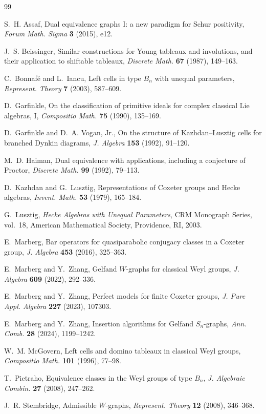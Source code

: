 \documentclass[11pt]{article}
\theoremstyle{definition}
\theoremstyle{remark}
\begin{document}
\begin{thebibliography}{99}

S.~H. Assaf,
\newblock Dual equivalence graphs I: a new paradigm for Schur positivity,
\newblock \emph{Forum Math. Sigma} \textbf{3} (2015), e12.

J.~S. Beissinger,
\newblock Similar constructions for Young tableaux and involutions, and
their application to shiftable tableaux,
\newblock \emph{Discrete Math.} \textbf{67} (1987), 149--163.

C.~Bonnaf\'e and L.~Iancu,
\newblock Left cells in type $B_n$ with unequal parameters,
\newblock \emph{Represent. Theory} \textbf{7} (2003), 587--609.

D.~Garfinkle,
\newblock On the classification of primitive ideals for complex
classical Lie algebras, I,
\newblock \emph{Compositio Math.} \textbf{75} (1990), 135--169.

D.~Garfinkle and D.~A. Vogan, Jr.,
\newblock On the structure of Kazhdan--Lusztig cells for branched Dynkin
diagrams,
\newblock \emph{J. Algebra} \textbf{153} (1992), 91--120.

M.~D. Haiman,
\newblock Dual equivalence with applications, including a conjecture of
Proctor,
\newblock \emph{Discrete Math.} \textbf{99} (1992), 79--113.

D.~Kazhdan and G.~Lusztig,
\newblock Representations of Coxeter groups and Hecke algebras,
\newblock \emph{Invent. Math.} \textbf{53} (1979), 165--184.

G.~Lusztig,
\newblock \emph{Hecke Algebras with Unequal Parameters},
\newblock CRM Monograph Series, vol.~18, American Mathematical Society,
Providence, RI, 2003.

E.~Marberg,
\newblock Bar operators for quasiparabolic conjugacy classes in a Coxeter
group,
\newblock \emph{J. Algebra} \textbf{453} (2016), 325--363.

E.~Marberg and Y.~Zhang,
\newblock Gelfand $W$-graphs for classical Weyl groups,
\newblock \emph{J. Algebra} \textbf{609} (2022), 292--336.

E.~Marberg and Y.~Zhang,
\newblock Perfect models for finite Coxeter groups,
\newblock \emph{J. Pure Appl. Algebra} \textbf{227} (2023), 107303.

E.~Marberg and Y.~Zhang,
\newblock Insertion algorithms for Gelfand $S_n$-graphs,
\newblock \emph{Ann. Comb.} \textbf{28} (2024), 1199--1242.

W.~M. McGovern,
\newblock Left cells and domino tableaux in classical Weyl groups,
\newblock \emph{Compositio Math.} \textbf{101} (1996), 77--98.

T.~Pietraho,
\newblock Equivalence classes in the Weyl groups of type $B_n$,
\newblock \emph{J. Algebraic Combin.} \textbf{27} (2008), 247--262.

J.~R. Stembridge,
\newblock Admissible $W$-graphs,
\newblock \emph{Represent. Theory} \textbf{12} (2008), 346--368.

\end{thebibliography}
\end{document}
